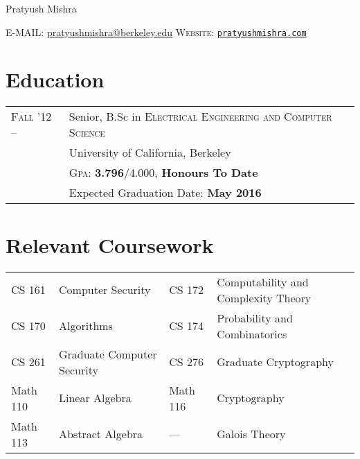 \documentclass[10pt]{article}
\begin{document}
\pagestyle{empty} %

\par{\centering
		{\Huge Pratyush Mishra
	}\bigskip\par}


        \textsc{E-MAIL:} \href{mailto:pratyushmishra@berkeley.edu}{pratyushmishra@berkeley.edu}
        \hfill
        \textsc{Website:} \href{http://www.pratyushmishra.com}{\texttt{pratyushmishra.com}}

\section{Education}
\begin{tabular}{R{2.5cm}p{11cm}}

  \textsc{Fall '12 --} & Senior, B.Sc in \textsc{Electrical Engineering and Computer Science} \\
                       & University of California, Berkeley \\
                       & \textsc{Gpa:} \textbf{3.796}/4.000, \textbf{Honours To Date} \\
                       & Expected Graduation Date: \textbf{May 2016}\\
\end{tabular}

\section{Relevant Coursework}
\begin{tabular}{R{2.5cm}p{4.5cm}R{1.5cm}p{6cm}}

  CS 161   & Computer Security          & CS 172   & Computability and Complexity Theory\\
  CS 170   & Algorithms                 & CS 174   & Probability and Combinatorics\\
  CS 261   & Graduate Computer Security & CS 276   & Graduate Cryptography\\
  Math 110 & Linear Algebra             & Math 116 & Cryptography\\
  Math 113 & Abstract Algebra           & ---      & Galois Theory\\
\end{tabular}



\end{document}

